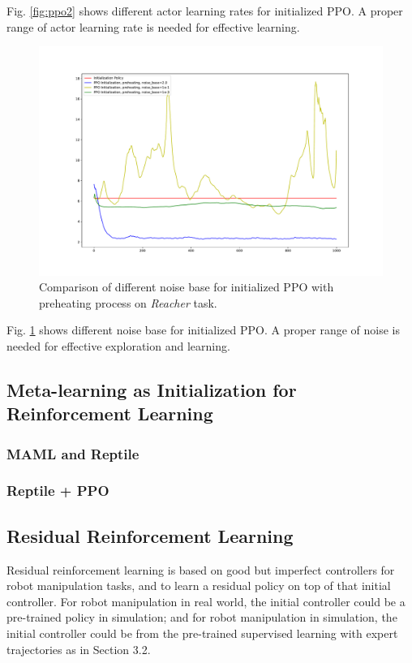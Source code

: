 \documentclass{article}
\begin{document}
Fig. \ref{fig:ppo2} shows different actor learning rates for initialized PPO. A proper range of actor learning rate is needed for effective learning.

\begin{figure}[htbp]
	\centering
	\includegraphics[scale=0.4]{img/ppo_compare4.pdf}
	\caption{Comparison of different noise base for initialized PPO with preheating process on \textit{Reacher} task.}
	\label{fig:ppo3}
\end{figure}

Fig. \ref{fig:ppo3} shows different noise base for initialized PPO. A proper range of noise is needed for effective exploration and learning.

\subsection{Meta-learning as Initialization for Reinforcement Learning}

\subsubsection{MAML and Reptile}

\subsubsection{Reptile + PPO}

\subsection{Residual Reinforcement Learning}
Residual reinforcement learning \cite{johannink2018residual} is based on good but imperfect controllers for robot manipulation tasks, and to learn a residual policy on top of that initial controller. For robot manipulation in real world, the initial controller could be a pre-trained policy in simulation; and for robot manipulation in simulation, the initial controller could be from the pre-trained supervised learning with expert trajectories as in Section 3.2.
\end{document}
